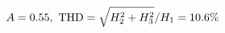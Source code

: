 \documentclass[preview]{standalone}
\begin{document}
\begin{align*}
\special{dvisvgm:raw <g id='unique000'>}A=0.55,\ \text{THD}=\sqrt{H_2^2+H_3^2}/H_1=10.6\%\special{dvisvgm:raw </g>}
\end{align*}
\end{document}
